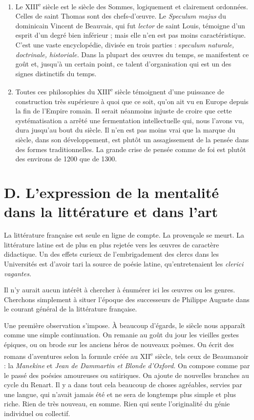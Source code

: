 \documentclass[french,twoside]{book} %
\begin{document}
\begin{enumerate}[itemsep=0pt,]
\item Le XIII\textsuperscript{e} siècle est le siècle des Sommes, logiquement et clairement ordonnées. Celles de saint Thomas sont des chefs-d’œuvre. Le {\itshape Speculum majus} du dominicain Vincent de Beauvais, qui fut {\itshape lector} de saint Louis, témoigne d’un esprit d’un degré bien inférieur ; mais elle n’en est pas moins caractéristique. C’est une vaste encyclopédie, divisée en trois parties : s{\itshape peculum naturale, doctrinale, historiale.} Dans la plupart des œuvres du temps, se manifestent ce goût et, jusqu’à un certain point, ce talent d’organisation qui est un des signes distinctifs du temps.
\item  {}
\label{p122} Toutes ces philosophies du XIII\textsuperscript{e} siècle témoignent d’une puissance de construction très supérieure à quoi que ce soit, qu’on ait vu en Europe depuis la fin de l’Empire romain. Il serait néanmoins injuste de croire que cette systématisation a arrêté une fermentation intellectuelle qui, nous l’avons vu, dura jusqu’au bout du siècle. Il n’en est pas moins vrai que la marque du siècle, dans son développement, est plutôt un assagissement de la pensée dans des formes traditionnelles. La grande crise de pensée comme de foi est plutôt des environs de 1200 que de 1300.

\end{enumerate}\section[D. L’expression de la mentalité dans la littérature et dans l’art]{D. L’expression de la mentalité dans la littérature et dans l’art}
\label{c11d}
\noindent La littérature française est seule en ligne de compte. La provençale se meurt. La littérature latine est de plus en plus rejetée vers les œuvres de caractère didactique. Un des effets curieux de l’embrigadement des clercs dans les Universités est d’avoir tari la source de poésie latine, qu’entretenaient les {\itshape clerici vagantes.}\par
Il n’y aurait aucun intérêt à chercher à énumérer ici les œuvres ou les genres. Cherchons simplement à situer l’époque des successeurs de Philippe Auguste dans le courant général de la littérature française.\par
Une première observation s’impose. À beaucoup d’égards, le siècle nous apparaît comme une simple continuation. On remanie au goût du jour les vieilles gestes épiques, ou on brode sur les anciens héros de nouveaux poèmes. On écrit des romans d’aventures selon la formule créée au XII\textsuperscript{e} siècle, tels ceux de Beaumanoir : la {\itshape Manekine} et {\itshape Jean de Dammartin et Blonde d’Oxford.} On compose comme par le passé des poésies amoureuses ou satiriques. On ajoute de nouvelles branches au cycle du Renart. Il y a dans tout cela beaucoup de choses agréables, servies par une langue, qui n’avait jamais été et ne sera de longtemps plus simple et plus riche. Rien de très nouveau, en somme. Rien qui sente l’originalité du génie individuel ou collectif.\par
\end{document}
